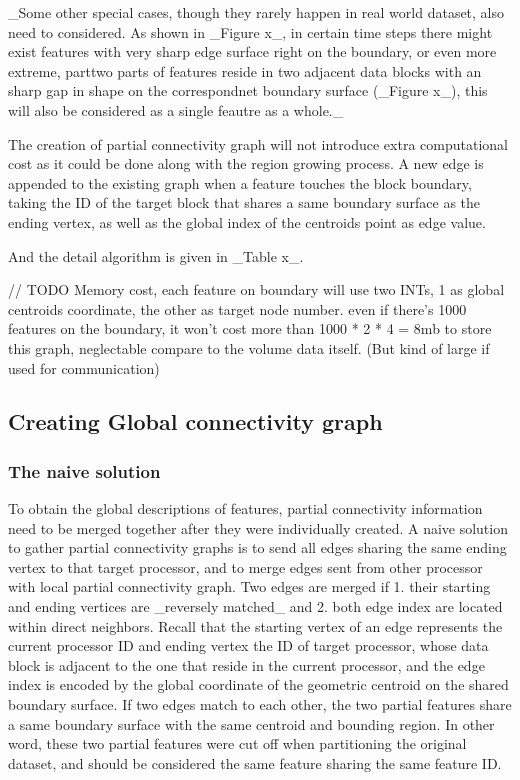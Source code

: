 \documentclass[10pt, conference, compsocconf]{IEEEtran}
\begin{document}
_Some other special cases, though they rarely happen in real world dataset, also need to considered. As shown in _Figure x_, in certain time steps there might exist features with very sharp edge surface right on the boundary, or even more extreme, parttwo parts of features reside in two adjacent data blocks with an sharp gap in shape on the correspondnet boundary surface (_Figure x_), this will also be considered as a single feautre as a whole._

The creation of partial connectivity graph will not introduce extra computational cost as it could be done along with the region growing process. A new edge is appended to the existing graph when a feature touches the block boundary, taking the ID of the target block that shares a same boundary surface as the ending vertex, as well as the global index of the centroids point as edge value.


And the detail algorithm is given in _Table x_.

// TODO
Memory cost, each feature on boundary will use two INTs, 1 as global centroids coordinate, the other as target node number. even if there's 1000 features on the boundary, it won’t cost more than 1000 * 2 * 4 = 8mb to store this graph, neglectable compare to the volume data itself. (But kind of large if used for communication)

\subsection{Creating Global connectivity graph}

\subsubsection{The naive solution}
To obtain the global descriptions of features, partial connectivity information need to be merged together after they were individually created. A naive solution to gather partial connectivity graphs is to send all edges sharing the same ending vertex to that target processor, and to merge edges sent from other processor with local partial connectivity graph. Two edges are merged if 1. their starting and ending vertices are _reversely matched_ and 2. both edge index are located within direct neighbors. Recall that the starting vertex of an edge represents the current processor ID and ending vertex the ID of target processor, whose data block is adjacent to the one that reside in the current processor, and the edge index is encoded by the global coordinate of the geometric centroid on the shared boundary surface. If two edges match to each other, the two partial features share a same boundary surface with the same centroid and bounding region. In other word, these two partial features were cut off when partitioning the original dataset, and should be considered the same feature sharing the same feature ID.
\end{document}
